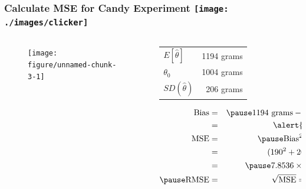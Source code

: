 \begin{frame}
\frametitle{Calculate MSE for Candy Experiment \hfill \texttt{[image: ./images/clicker]}}


\begin{columns} 

\begin{column}[c]{4cm} 
\begin{figure}
\begin{knitrout}
\color{fgcolor}

{\centering \texttt{[image: figure/unnamed-chunk-3-1]} 

}



\end{knitrout}
\end{figure}

\end{column} 

\begin{column}[c]{6cm} 
\small
   \begin{tabular}{lr}
   \hline
   \hline
   $E[\hat{\theta}]$& 1194 grams\\
   $\theta_0$& 1004 grams\\
   $SD(\widehat{\theta})$& 206 grams\\
   \hline
   \end{tabular}
\vspace{2em}

\begin{eqnarray*}
	\mbox{Bias} &=& \pause 1194 \mbox{ grams} - 1004 \mbox{ grams}\\
		&=& \alert{190 \mbox{ grams}}\\
		\mbox{MSE} &=&\pause  \mbox{Bias}^2 + \mbox{Variance}\\
			&=& (190^2 + 206^2)\mbox{ grams}^2\\
				&=&\pause \ensuremath{7.8536\times 10^{4}} \mbox{ grams}^2\\ \pause
				\mbox{RMSE} &=& \sqrt{\mbox{MSE}} =  280 \mbox{ grams}
\end{eqnarray*}
\end{column} 

\end{columns} 


\end{frame}
